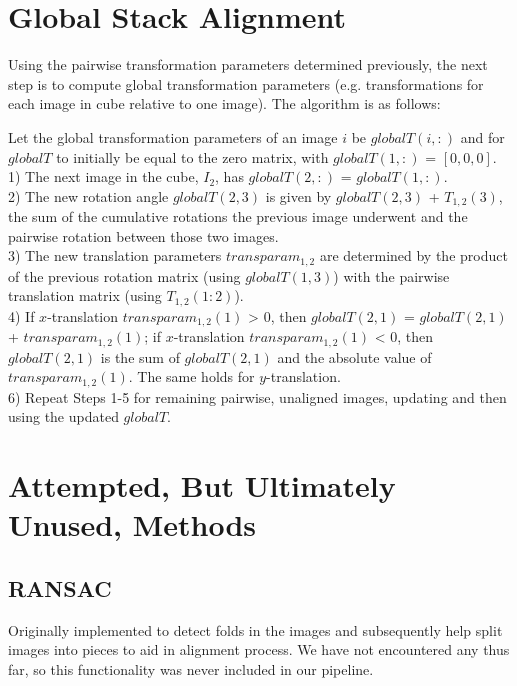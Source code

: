 \documentclass{article}
\begin{document}
\section{Global Stack Alignment}
Using the pairwise transformation parameters determined previously, the next step is to compute global transformation parameters (e.g. transformations for each image in cube relative to one image). The algorithm is as follows:
	\begin{algorithm}
	\DontPrintSemicolon
	Let the global transformation parameters of an image $i$ be $globalT(i,:)$ and for $globalT$ to initially be equal to the zero matrix, with $globalT(1,:)$ = $[0, 0, 0]$.\\
	1) The next image in the cube, $I_{2}$, has $globalT(2,:)$ = $globalT(1,:)$.\\
	2) The new rotation angle $globalT(2,3)$ is given by $globalT(2,3)$ + $T_{1,2}(3)$, the sum of the cumulative rotations the previous image underwent and the pairwise rotation between those two images.\\
	3) The new translation parameters $transparam_{1,2}$ are determined by the product of the previous rotation matrix (using $globalT(1,3)$) with the pairwise translation matrix (using $T_{1,2}(1:2)$).\\  
	4) If $x$-translation $transparam_{1,2}(1)$ > $0$, then $globalT(2,1)$ = $globalT(2,1)$ + $transparam_{1,2}(1)$; if $x$-translation $transparam_{1,2}(1)$ < $0$, then $globalT(2,1)$ is the sum of $globalT(2,1)$ and the absolute value of $transparam_{1,2}(1)$. The same holds for $y$-translation.\\
	6) Repeat Steps 1-5 for remaining pairwise, unaligned images, updating and then using the updated $globalT$. 
	\end{algorithm}

\section{Attempted, But Ultimately Unused, Methods}
\subsection{RANSAC}
Originally implemented to detect folds in the images and subsequently help split images into pieces to aid in alignment process. We have not encountered any thus far, so this functionality was never included in our pipeline.
\end{document}
